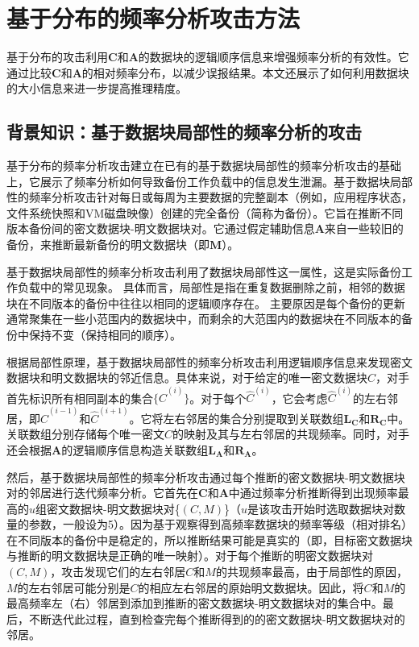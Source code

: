 \chapter{基于分布的频率分析攻击方法}
\label{sec:DistributionAttack}

基于分布的攻击利用$\mathbf{C}$和$\mathbf{A}$的数据块的逻辑顺序信息来增强频率分析的有效性。它通过比较$\mathbf{C}$和$\mathbf{A}$的相对频率分布，以减少误报结果。本文还展示了如何利用数据块的大小信息来进一步提高推理精度。

\section{背景知识：基于数据块局部性的频率分析的攻击}

\label{sec:DistributionAttack-prior-attack}

基于分布的频率分析攻击建立在已有的基于数据块局部性的频率分析攻击\cite{li2017information}的基础上，它展示了频率分析如何导致备份工作负载中的信息发生泄漏。基于数据块局部性的频率分析攻击针对每日或每周为主要数据的完整副本（例如，应用程序状态，文件系统快照和VM磁盘映像）创建的完全备份（简称为备份）。它旨在推断不同版本备份间的密文数据块-明文数据块对。它通过假定辅助信息$\mathbf{A}$来自一些较旧的备份，来推断最新备份的明文数据块（即$\mathbf{M}$）。

基于数据块局部性的频率分析攻击利用了数据块局部性这一属性\cite{xia2011silo,zhu2008avoiding,lillibridge2009sparse}，这是实际备份工作负载中的常见现象。 具体而言，局部性是指在重复数据删除之前，相邻的数据块在不同版本的备份中往往以相同的逻辑顺序存在。 主要原因是每个备份的更新通常聚集在一些小范围内的数据块中，而剩余的大范围内的数据块在不同版本的备份中保持不变（保持相同的顺序）。

根据局部性原理，基于数据块局部性的频率分析攻击利用逻辑顺序信息来发现密文数据块和明文数据块的邻近信息。具体来说，对于给定的唯一密文数据块$C$，对手首先标识所有相同副本的集合$\{\hat{C}^{(i)}\}$。对于每个$\hat{C}^{(i)}$，它会考虑$\hat{C}^{(i)}$的左右邻居，即$\hat{C}^{(i-1)}$和$\hat{C}^{(i+1)}$。它将左右邻居的集合分别提取到关联数组$\mathbf{L_C}$和$\mathbf{R_C}$中。关联数组分别存储每个唯一密文$C$的映射及其与左右邻居的共现频率。同时，对手还会根据$\mathbf{A}$的逻辑顺序信息构造关联数组$\mathbf{L_A}$和$\mathbf{R_A}$。

然后，基于数据块局部性的频率分析攻击通过每个推断的密文数据块-明文数据块对的邻居进行迭代频率分析。它首先在$\mathbf{C}$和$\mathbf{A}$中通过频率分析推断得到出现频率最高的$u$组密文数据块-明文数据块对\{$(C,M)$\}（$u$是该攻击开始时选取数据块对数量的参数，一般设为5）。因为基于观察得到高频率数据块的频率等级（相对排名）在不同版本的备份中是稳定的，所以推断结果可能是真实的（即，目标密文数据块与推断的明文数据块是正确的唯一映射）。对于每个推断的明密文数据块对$(C,M)$，攻击发现它们的左右邻居$C$和$M$的共现频率最高，由于局部性的原因，$M$的左右邻居可能分别是$C$的相应左右邻居的原始明文数据块。因此，将$C$和$M$的最高频率左（右）邻居到添加到推断的密文数据块-明文数据块对的集合中。最后，不断迭代此过程，直到检查完每个推断得到的的密文数据块-明文数据块对的邻居。

